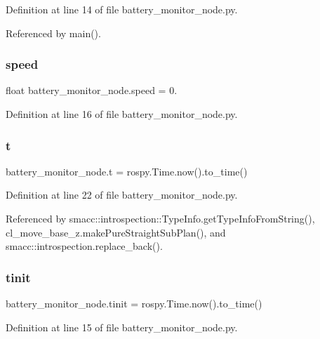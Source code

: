 Definition at line 14 of file battery\+\_\+monitor\+\_\+node.\+py.



Referenced by main().

\mbox{\label{namespacebattery__monitor__node_a78ba7243610b635b1712c5af728edc13}} 
\subsubsection{\texorpdfstring{speed}{speed}}
{\footnotesize\ttfamily float battery\+\_\+monitor\+\_\+node.\+speed = 0.}



Definition at line 16 of file battery\+\_\+monitor\+\_\+node.\+py.

\mbox{\label{namespacebattery__monitor__node_a7a63d20d1ea461e280f4eb5b47f925cd}} 
\subsubsection{\texorpdfstring{t}{t}}
{\footnotesize\ttfamily battery\+\_\+monitor\+\_\+node.\+t = rospy.\+Time.\+now().to\+\_\+time()}



Definition at line 22 of file battery\+\_\+monitor\+\_\+node.\+py.



Referenced by smacc\+::introspection\+::\+Type\+Info.\+get\+Type\+Info\+From\+String(), cl\+\_\+move\+\_\+base\+\_\+z.\+make\+Pure\+Straight\+Sub\+Plan(), and smacc\+::introspection.\+replace\+\_\+back().

\mbox{\label{namespacebattery__monitor__node_adb6d4f12628aa05bce6384b0f89001e4}} 
\subsubsection{\texorpdfstring{tinit}{tinit}}
{\footnotesize\ttfamily battery\+\_\+monitor\+\_\+node.\+tinit = rospy.\+Time.\+now().to\+\_\+time()}



Definition at line 15 of file battery\+\_\+monitor\+\_\+node.\+py.

